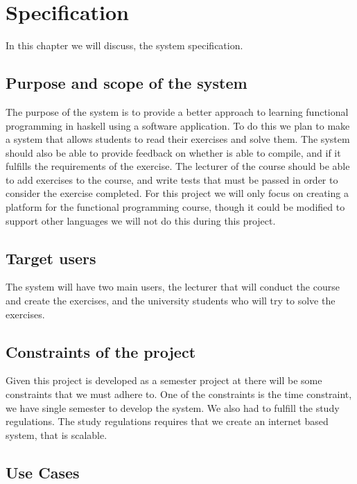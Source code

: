 \chapter{Specification}
In this chapter we will discuss, the system specification. 

\section*{Purpose and scope of the system }
The purpose of the system is to provide a better approach to learning functional programming in haskell using a software application.
To do this we plan to make a system that allows students to read their exercises and solve them. The system should also be able to provide feedback on whether is able to compile, and if it fulfills the requirements of the exercise. The lecturer of the course should be able to add exercises to the course, and write tests that must be passed in order to consider the exercise completed.
For this project we will only focus on creating a platform for the functional programming course, though it could be modified to support other languages we will not do this during this project. 

\section*{Target users}
The system will have two main users, the lecturer that will conduct the course and create the exercises, and the university students who will try to solve the exercises.


\section*{Constraints of the project}
Given this project is developed as a semester project at \aau there will be some constraints that we must adhere to. 
One of the constraints is the time constraint, we have single semester to develop the system. 
We also had to fulfill the study regulations. The study regulations requires that we create an internet based system, that is scalable. 
 
\section*{Use Cases}

